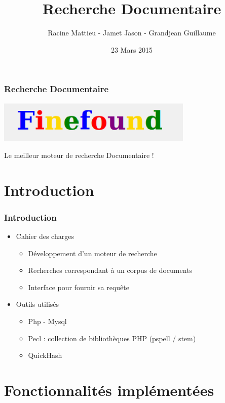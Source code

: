 \documentclass{beamer}
\title{Recherche Documentaire}
\author{Racine Mattieu - Jamet Jason - Grandjean Guillaume}
\institute{Faculté des Sciences}
\date{23 Mars 2015}
\begin{document}
    \begin{frame}
     \titlepage
    \end{frame}


    \begin{frame}[allowframebreaks] %
      \frametitle{Recherche Documentaire}
      \begin{center}
       \includegraphics[width=0.7\textwidth]{finefound.eps}
      \end{center}
      \begin{center}
      Le meilleur moteur de recherche Documentaire !    
      \end{center}
    \end{frame}
    

    \section{Introduction}
    \begin{frame}
     \frametitle{Introduction}
     \begin{itemize}
      \item Cahier des charges
	\begin{itemize}
	  \item Développement d'un moteur de recherche
	  \item Recherches correspondant à un corpus de documents
	  \item Interface pour fournir sa requête
	\end{itemize}
      \item Outils utilisés
	\begin{itemize}
	  \item Php - Mysql
	  \item Pecl : collection de bibliothèques PHP (pspell / stem)
	  \item QuickHash
	\end{itemize}
     \end{itemize}

    \end{frame}
    
    \section{Fonctionnalités implémentées}
\end{document}
